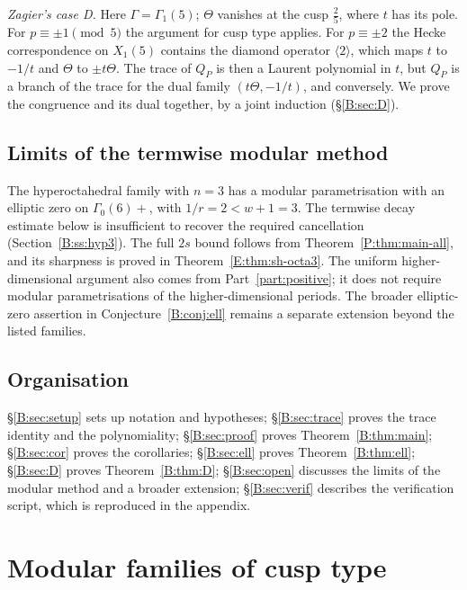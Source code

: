 \documentclass[11pt,a4paper]{article}
\theoremstyle{definition}\newtheorem{definition}[theorem]{Definition}
\theoremstyle{remark}\newtheorem{remark}[theorem]{Remark}
\numberwithin{equation}{section}
\begin{document}
\emph{Zagier's case D.} Here $\Gamma=\Gamma_1(5)$; $\Theta$ vanishes at the cusp $\frac25$, where $t$ has its pole. For
$p\equiv\pm1\pmod5$ the argument for cusp type applies. For $p\equiv\pm2$ the Hecke correspondence on $X_1(5)$ contains the
diamond operator $\langle2\rangle$, which maps $t$ to $-1/t$ and $\Theta$ to $\pm t\Theta$. The trace of $Q_P$ is then a
Laurent polynomial in $t$, but $Q_P$ is a branch of the trace for the dual family $(t\Theta,-1/t)$, and conversely. We
prove the congruence and its dual together, by a joint induction (\S\ref{B:sec:D}).

\subsection{Limits of the termwise modular method}
The hyperoctahedral family with $n=3$ has a modular parametrisation with an elliptic zero on $\Gamma_0(6)+$, with $1/r=2<w+1=3$. The termwise decay estimate below is insufficient to recover the required cancellation (Section~\ref{B:ss:hyp3}). The full $2s$ bound follows from Theorem~\ref{P:thm:main-all}, and its sharpness is proved in Theorem~\ref{E:thm:sh-octa3}. The uniform higher-dimensional argument also comes from Part~\ref{part:positive}; it does not require modular parametrisations of the higher-dimensional periods. The broader elliptic-zero assertion in Conjecture~\ref{B:conj:ell} remains a separate extension beyond the listed families.

\subsection*{Organisation}
\S\ref{B:sec:setup} sets up notation and hypotheses; \S\ref{B:sec:trace} proves the trace identity and the
polynomiality; \S\ref{B:sec:proof} proves Theorem~\ref{B:thm:main}; \S\ref{B:sec:cor} proves the
corollaries; \S\ref{B:sec:ell} proves Theorem~\ref{B:thm:ell}; \S\ref{B:sec:D} proves Theorem~\ref{B:thm:D};
\S\ref{B:sec:open} discusses the limits of the modular method and a broader extension; \S\ref{B:sec:verif} describes the verification script, which is
reproduced in the appendix.

\section{Modular families of cusp type}\label{B:source-main-2}\label{B:sec:setup}
\end{document}

